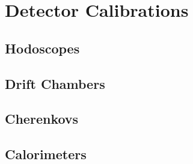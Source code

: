 \section{Detector Calibrations}
\subsection{Hodoscopes}
\subsection{Drift Chambers}
\subsection{Cherenkovs}
\subsection{Calorimeters}
